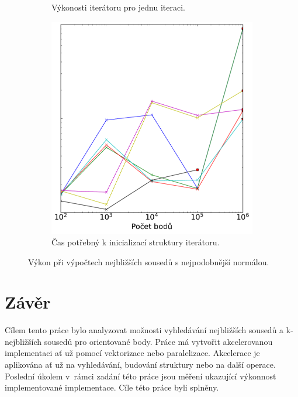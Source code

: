 \begin{figure}[ht]
\begin{subfigure}[t]{0.49\columnwidth}
\caption{Výkonosti iterátoru pro jednu iteraci.}
\end{subfigure}
\hfill
\begin{subfigure}[t]{0.49\columnwidth}
    \centering  
    \includegraphics[scale=0.4]{obrazky-figures/benchmark/nn_normal/benchmark_nn_normal_speed_iterator.pdf}
\caption{Čas potřebný k inicializací struktury iterátoru. }
\label{fig:nn_normal_benchmark_it}
\end{subfigure}


    \caption{Výkon při výpočtech nejbližších sousedů s nejpodobnější normálou.}
\label{fig:nn_normal_benchmark}

\end{figure}

\chapter{Závěr}
Cílem tento práce bylo analyzovat možnosti vyhledávání nejbližších sousedů a k-nejbližších sousedů pro orientované body. Práce má vytvořit akcelerovanou implementaci ať už pomocí vektorizace nebo paralelizace. Akcelerace je aplikována ať už na vyhledávání, budování struktury nebo na další operace. Poslední úkolem v~rámci zadání této práce jsou měření ukazující výkonnost implementované implementace. Cíle této práce byli splněny.

